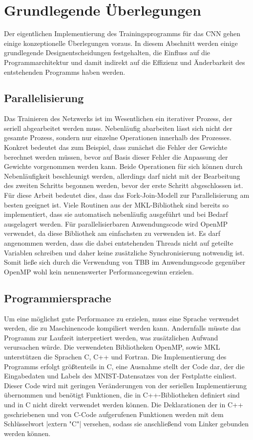 \documentclass[../main.tex]{subfiles}
\begin{document}
\section{Grundlegende Überlegungen}
Der eigentlichen Implementierung des Trainingsprogramms für das CNN gehen einige konzeptionelle Überlegungen voraus. In diesem Abschnitt werden einige grundlegende Designentscheidungen festgehalten, die Einfluss auf die Programmarchitektur und damit indirekt auf die Effizienz und Änderbarkeit des entstehenden Programms haben werden. 

\subsection{Parallelisierung}
Das Trainieren des Netzwerks ist im Wesentlichen ein iterativer Prozess, der seriell abgearbeitet werden muss. Nebenläufig abarbeiten lässt sich nicht der gesamte Prozess, sondern nur einzelne Operationen innerhalb des Prozesses. Konkret bedeutet das zum Beispiel, dass zunächst die Fehler der Gewichte berechnet werden müssen, bevor auf Basis dieser Fehler die Anpassung der Gewichte vorgenommen werden kann. Beide Operationen für sich können durch Nebenläufigkeit beschleunigt werden, allerdings darf nicht mit der Bearbeitung des zweiten Schritts begonnen werden, bevor der erste Schritt abgeschlossen ist. Für diese Arbeit bedeutet dies, dass das Fork-Join-Modell zur Parallelisierung am besten geeignet ist. Viele Routinen aus der MKL-Bibliothek sind bereits so implementiert, dass sie automatisch nebenläufig ausgeführt und bei Bedarf ausgelagert werden. Für parallelisierbaren Anwendungscode wird OpenMP verwendet, da diese Bibliothek am einfachsten zu verwenden ist. Es darf angenommen werden, dass die dabei entstehenden Threads nicht auf geteilte Variablen schreiben und daher keine zusätzliche Synchronisierung notwendig ist. Somit ließe sich durch die Verwendung von TBB im Anwendungscode gegenüber OpenMP wohl kein nennenswerter Performancegewinn erzielen. 

\subsection{Programmiersprache}
Um eine möglichst gute Performance zu erzielen, muss eine Sprache verwendet werden, die zu Maschinencode kompiliert werden kann. Andernfalls müsste das Programm zur Laufzeit interpretiert werden, was zusätzlichen Aufwand verursachen würde. Die verwendeten Bibliotheken OpenMP, sowie MKL unterstützen die Sprachen C, C++ und Fortran. Die Implementierung des Programms erfolgt größtenteils in C, eine Ausnahme stellt der Code dar, der die Eingabedaten und Labels des MNIST-Datensatzes von der Festplatte einliest. Dieser Code wird mit geringen Veränderungen von der seriellen Implementierung übernommen und benötigt Funktionen, die in C++-Bibliotheken definiert sind und in C nicht direkt verwendet werden können. Die Deklarationen der in C++ geschriebenen und von C-Code aufgerufenen Funktionen werden mit dem Schlüsselwort |extern "C"| versehen, sodass sie anschließend vom Linker gebunden werden können. 
\end{document}
